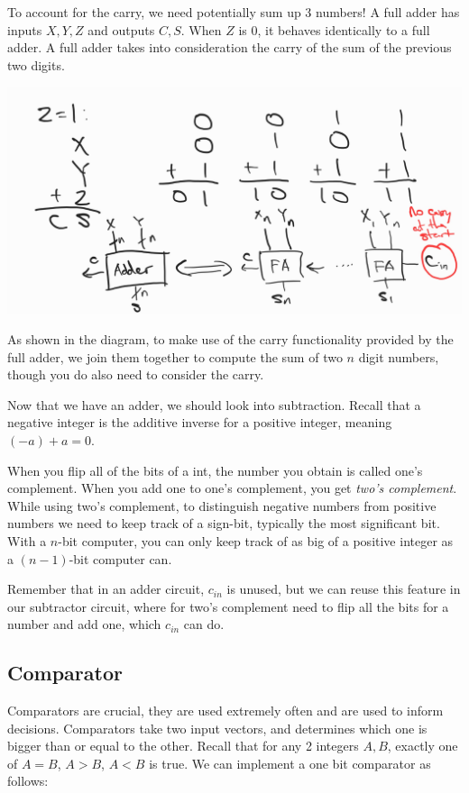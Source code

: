 To account for the carry, we need potentially sum up 3 numbers! A full adder has inputs $X, Y, Z$ and outputs $C, S$. When $Z$ is 0, it behaves identically to a full adder. A full adder takes into consideration the carry of the sum of the previous two digits.

\includegraphics{csc258/figures/fulladder.jpg}

As shown in the diagram, to make use of the carry functionality provided by the full adder, we join them together to compute the sum of two $n$ digit numbers, though you do also need to consider the carry.

Now that we have an adder, we should look into subtraction. Recall that a negative integer is the additive inverse for a positive integer, meaning $(-a) + a = 0$.

When you flip all of the bits of a int, the number you obtain is called one's complement. When you add one to one's complement, you get \textit{two's complement}. While using two's complement, to distinguish negative numbers from positive numbers we need to keep track of a sign-bit, typically the most significant bit. With a $n$-bit computer, you can only keep track of as big of a positive integer as a $(n-1)$-bit computer can.

Remember that in an adder circuit, $c_{in}$ is unused, but we can reuse this feature in our subtractor circuit, where for two's complement need to flip all the bits for a number and add one, which $c_{in}$ can do.

\subsection{Comparator}

Comparators are crucial, they are used extremely often and are used to inform decisions. Comparators take two input vectors, and determines which one is bigger than or equal to the other. Recall that for any 2 integers $A, B$, exactly one of $A = B$, $A > B$, $A < B$ is true. We can implement a one bit comparator as follows:

